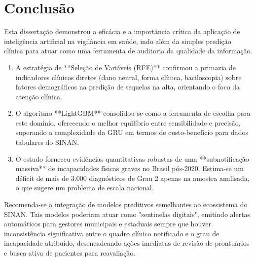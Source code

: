 \documentclass[12pt, a4paper]{report}
\begin{document}
\chapter{Conclusão}

Esta dissertação demonstrou a eficácia e a importância crítica da aplicação de inteligência artificial na vigilância em saúde, indo além da simples predição clínica para atuar como uma ferramenta de auditoria da qualidade da informação.

\begin{enumerate}
    \item A estratégia de **Seleção de Variáveis (RFE)** confirmou a primazia de indicadores clínicos diretos (dano neural, forma clínica, baciloscopia) sobre fatores demográficos na predição de sequelas na alta, orientando o foco da atenção clínica.
    \item O algoritmo **LightGBM** consolidou-se como a ferramenta de escolha para este domínio, oferecendo o melhor equilíbrio entre sensibilidade e precisão, superando a complexidade da GRU em termos de custo-benefício para dados tabulares do SINAN.
    \item O estudo forneceu evidências quantitativas robustas de uma **subnotificação massiva** de incapacidades físicas graves no Brasil pós-2020. Estima-se um déficit de mais de 3.000 diagnósticos de Grau 2 apenas na amostra analisada, o que sugere um problema de escala nacional.
\end{enumerate}

Recomenda-se a integração de modelos preditivos semelhantes ao ecossistema do SINAN. Tais modelos poderiam atuar como "sentinelas digitais", emitindo alertas automáticos para gestores municipais e estaduais sempre que houver inconsistência significativa entre o quadro clínico notificado e o grau de incapacidade atribuído, desencadeando ações imediatas de revisão de prontuários e busca ativa de pacientes para reavaliação.



\end{document}
